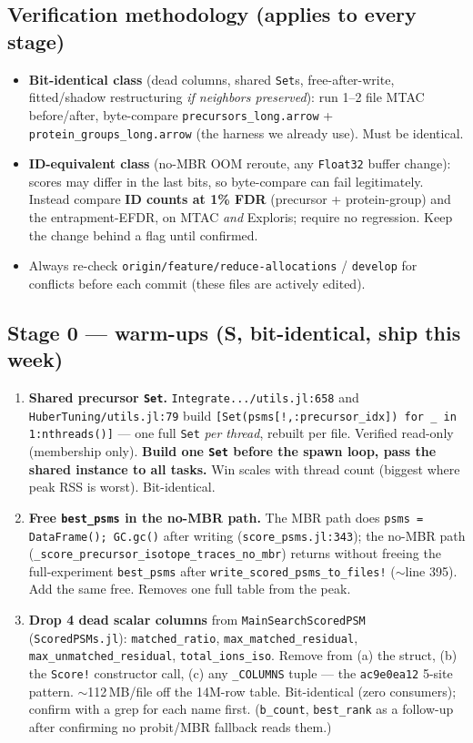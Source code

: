 \documentclass[11pt]{article}
\newcommand{\code}[1]{\texttt{\small #1}}
\begin{document}
\subsection*{Verification methodology (applies to every stage)}
\begin{itemize}
  \item \textbf{Bit-identical class} (dead columns, shared \code{Set}s, free-after-write,
  fitted/shadow restructuring \emph{if neighbors preserved}): run 1--2 file MTAC before/after,
  byte-compare \code{precursors\_long.arrow} + \code{protein\_groups\_long.arrow}
  (the harness we already use). Must be identical.
  \item \textbf{ID-equivalent class} (no-MBR OOM reroute, any \code{Float32} buffer change):
  scores may differ in the last bits, so byte-compare can fail legitimately. Instead compare
  \textbf{ID counts at 1\% FDR} (precursor + protein-group) and the entrapment-EFDR, on MTAC
  \emph{and} Exploris; require no regression. Keep the change behind a flag until confirmed.
  \item Always re-check \code{origin/feature/reduce-allocations} / \code{develop} for
  conflicts before each commit (these files are actively edited).
\end{itemize}

\subsection*{Stage 0 --- warm-ups (S, bit-identical, ship this week)}
\begin{enumerate}
  \item \textbf{Shared precursor \code{Set}.} \code{Integrate.../utils.jl:658} and
  \code{HuberTuning/utils.jl:79} build \code{[Set(psms[!,:precursor\_idx]) for \_ in
  1:nthreads()]} --- one full \code{Set} \emph{per thread}, rebuilt per file. Verified
  read-only (membership only). \textbf{Build one \code{Set} before the spawn loop, pass the
  shared instance to all tasks.} Win scales with thread count (biggest where peak RSS is
  worst). Bit-identical.
  \item \textbf{Free \code{best\_psms} in the no-MBR path.} The MBR path does
  \code{psms = DataFrame(); GC.gc()} after writing
  (\code{score\_psms.jl:343}); the no-MBR path
  (\code{\_score\_precursor\_isotope\_traces\_no\_mbr}) returns without freeing the
  full-experiment \code{best\_psms} after \code{write\_scored\_psms\_to\_files!}
  ($\sim$line 395). Add the same free. Removes one full table from the peak.
  \item \textbf{Drop 4 dead scalar columns} from \code{MainSearchScoredPSM}
  (\code{ScoredPSMs.jl}): \code{matched\_ratio}, \code{max\_matched\_residual},
  \code{max\_unmatched\_residual}, \code{total\_ions\_iso}. Remove from (a) the struct,
  (b) the \code{Score!} constructor call, (c) any \code{\_COLUMNS} tuple --- the
  \code{ac9e0ea12} 5-site pattern. $\sim$112\,MB/file off the 14M-row table. Bit-identical
  (zero consumers); confirm with a grep for each name first. (\code{b\_count},
  \code{best\_rank} as a follow-up after confirming no probit/MBR fallback reads them.)
\end{enumerate}
\end{document}
